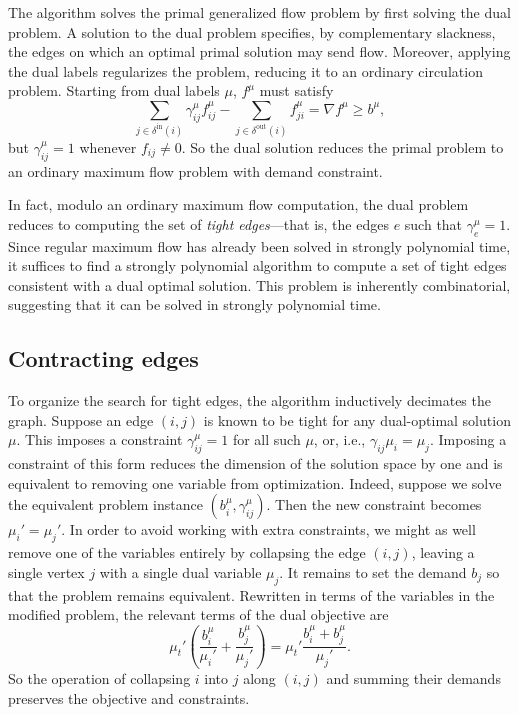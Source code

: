 \documentclass[11pt]{article}
\theoremstyle{definition}
\theoremstyle{definition}
\newcommand{\fu}{f^{\mu}}
\newcommand{\biu}{b_{i}^{\mu}}
\newcommand{\gij}{\gamma_{ij}}
\newcommand{\geu}{\gamma_e^{\mu}}
\newcommand{\giij}{\gamma_{ij}^{\mu}}
\newcommand{\din}{\delta^{\text{in}}}
\newcommand{\dout}{\delta^{\text{out}}}
\begin{document}
	The algorithm solves the primal generalized flow problem by first solving the dual problem.
    A solution to the dual problem specifies, by complementary slackness, the edges on which an optimal
    primal solution may send flow. Moreover, applying the dual labels regularizes the problem, reducing
    it to an ordinary circulation problem. Starting from dual labels $\mu$, $f^{\mu}$ must satisfy
    \[ \sum_{j \in \din(i)} \giij \fu_{ij} - \sum_{j \in \dout(i)} \fu_{ji}
     = \nabla f^{\mu} \geq b^{\mu}, \]
    but $\giij = 1$ whenever $f_{ij} \neq 0$. So the dual solution reduces the primal problem
    to an ordinary maximum flow problem with demand constraint.
    
    In fact, modulo an ordinary maximum flow computation, the dual problem reduces to computing
    the set of \emph{tight edges}---that is, the edges $e$ such that $\geu = 1$. Since regular maximum
    flow has already been solved in strongly polynomial time, it suffices to find a strongly polynomial
    algorithm to compute a set of tight edges consistent with a dual optimal solution. This problem
    is inherently combinatorial, suggesting that it can be solved in strongly polynomial time.
    
    \subsection{Contracting edges}
    To organize the search for tight edges, the algorithm inductively decimates the graph.
    Suppose an edge $(i, j)$ is known to be tight for any dual-optimal solution $\mu$. This
    imposes a constraint $\giij = 1$ for all such $\mu$, or, i.e., $\gij \mu_i = \mu_j$.
    Imposing a constraint of this form reduces the dimension of the solution
    space by one and is equivalent to removing one variable from optimization. Indeed,
    suppose we solve the equivalent problem instance $(\biu, \giij)$. Then the new constraint
    becomes $\mu_i' = \mu_j'$. In order to avoid working with extra constraints, we might
    as well remove one of the variables entirely by collapsing the edge $(i, j)$, leaving a single
    vertex $j$ with a single dual variable $\mu_j$. It remains to set the demand $b_j$ so
    that the problem remains equivalent. Rewritten in terms of the variables in
    the modified problem, the relevant terms of the dual objective are
    \[ \mu_t' \left(\frac{b_i^\mu}{\mu_i'} + \frac{b_j^\mu}{\mu_j'}\right)
     = \mu_t' \frac{b_i^\mu + b_j^\mu}{\mu_j'}. \]
	So the operation of collapsing $i$ into $j$ along $(i, j)$ and summing their demands
	preserves the objective and constraints.
	
\end{document}
